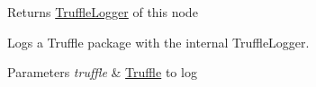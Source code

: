 \begin{DoxyReturn}{Returns}
\hyperlink{}{Truffle\+Logger} of this node 
\end{DoxyReturn}
Logs a Truffle package with the internal Truffle\+Logger. 


\begin{DoxyParams}{Parameters}
{\em truffle} & \hyperlink{}{Truffle} to log \\
\hline
\end{DoxyParams}
